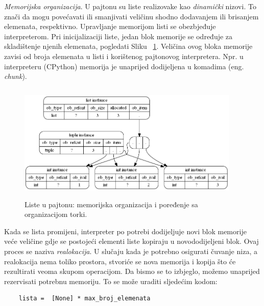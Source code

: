 \textit{Memorijska organizacija}.  U pajtonu su liste realizovake kao \textit{dinamički} nizovi. To znači da mogu povećavati ili smanjivati veličinu shodno dodavanjem ili brisanjem elemenata, respektivno. Upravljanje memorijom listi se obezbjeđuje interpreterom.  Pri inicijalizaciji liste, jedan blok memorije se određuje za skladištenje njenih elemenata, pogledati Sliku~	\ref{fig: mem_list_org}.  Veličina ovog bloka memorije zavisi od broja elemenata u listi i korištenog pajtonovog  interpretera.  Npr. u interpreteru (CPython)  memorija je unaprijed dodijeljena u komadima (eng. \textit{chunk}).

 \begin{figure}[!ht]
	\centering
	\includegraphics[width=300pt,height=160pt]{slike/img-list-tuple.png}   %

	\caption{Liste u pajtonu: memorijska organizacija i poređenje sa organizacijom torki.} 	\label{fig: mem_list_org}
\end{figure}




 Kada se lista promijeni, interpreter po potrebi dodijeljuje novi blok memorije veće veličine gdje se postojeći elementi liste kopiraju u novododijeljeni blok. Ovaj proces se naziva \textit{realokacija}.  U slučaju kada je potrebno osigurati čuvanje niza, a realokacija nema toliko prostora, stvoriće se nova memorija i kopija što će rezultirati veoma skupom operacijom. Da bismo se to izbjeglo, možemo unaprijed rezervisati potrebnu memoriju. To se može uraditi sljedećim kodom:
 \begin{verbatim}
    lista =  [None] * max_broj_elemenata
 \end{verbatim}

